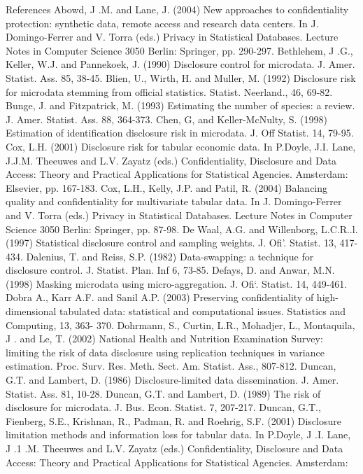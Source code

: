 References
Abowd, J .M. and Lane, J. (2004) New approaches to confidentiality protection: synthetic
data, remote access and research data centers. In J. Domingo-Ferrer and V. Torra
(eds.) Privacy in Statistical Databases. Lecture Notes in Computer Science 3050
Berlin: Springer, pp. 290-297.
Bethlehem, J .G., Keller, W.J. and Pannekoek, J. (1990) Disclosure control for microdata.
J. Amer. Statist. Ass. 85, 38-45.
Blien, U., Wirth, H. and Muller, M. (1992) Disclosure risk for microdata stemming from
official statistics. Statist. Neerland., 46, 69-82.
Bunge, J. and Fitzpatrick, M. (1993) Estimating the number of species: a review. J. Amer.
Statist. Ass. 88, 364-373.
Chen, G, and Keller-McNulty, S. (1998) Estimation of identification disclosure risk in
microdata. J. Off Statist. 14, 79-95.
Cox, L.H. (2001) Disclosure risk for tabular economic data. In P.Doyle, J.I. Lane, J.J.M.
Theeuwes and L.V. Zayatz (eds.) Conﬁdentiality, Disclosure and Data Access:
Theory and Practical Applications for Statistical Agencies. Amsterdam: Elsevier, pp.
167-183.
Cox, L.H., Kelly, J.P. and Patil, R. (2004) Balancing quality and confidentiality for
multivariate tabular data. In J. Domingo-Ferrer and V. Torra (eds.) Privacy in
Statistical Databases. Lecture Notes in Computer Science 3050 Berlin: Springer, pp.
87-98.
De Waal, A.G. and Willenborg, L.C.R..l. (1997) Statistical disclosure control and
sampling weights. J. Oﬁ’. Statist. 13, 417-434.
Dalenius, T. and Reiss, S.P. (1982) Data-swapping: a technique for disclosure control. J.
Statist. Plan. Inf 6, 73-85.
Defays, D. and Anwar, M.N. (1998) Masking microdata using micro-aggregation. J. Oﬁ‘.
Statist. 14, 449-461.
Dobra A., Karr A.F. and Sanil A.P. (2003) Preserving confidentiality of high-dimensional
tabulated data: statistical and computational issues. Statistics and Computing, 13, 363-
370.
Dohrmann, S., Curtin, L.R., Mohadjer, L., Montaquila, J . and Le, T. (2002) National
Health and Nutrition Examination Survey: limiting the risk of data disclosure using
replication techniques in variance estimation. Proc. Surv. Res. Meth. Sect. Am. Statist.
Ass., 807-812.
Duncan, G.T. and Lambert, D. (1986) Disclosure-limited data dissemination. J. Amer.
Statist. Ass. 81, 10-28.
Duncan, G.T. and Lambert, D. (1989) The risk of disclosure for microdata. J. Bus. Econ.
Statist. 7, 207-217.
Duncan, G.T., Fienberg, S.E., Krishnan, R., Padman, R. and Roehrig, S.F. (2001)
Disclosure limitation methods and information loss for tabular data. In P.Doyle, J .I.
Lane, J .1 .M. Theeuwes and L.V. Zayatz (eds.) Conﬁdentiality, Disclosure and Data
Access: Theory and Practical Applications for Statistical Agencies. Amsterdam:
